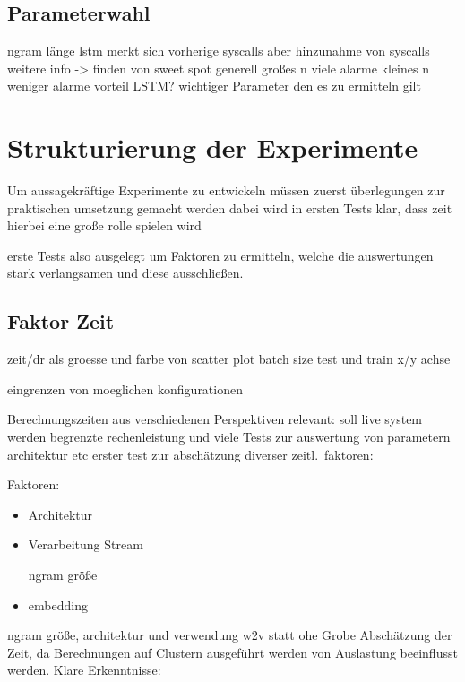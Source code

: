         \subsection{Parameterwahl}
            ngram länge
            lstm merkt sich vorherige syscalls aber hinzunahme von syscalls weitere info
            -> finden von sweet spot
            generell großes n viele alarme
            kleines n weniger alarme  vorteil LSTM\@?
            wichtiger Parameter den es zu ermitteln gilt


    \section{Strukturierung der Experimente}\label{sec:StrukExp}
        Um aussagekräftige Experimente zu entwickeln müssen zuerst 
        überlegungen zur praktischen umsetzung gemacht werden
        dabei wird in ersten Tests klar, dass zeit hierbei eine große rolle spielen wird

        erste Tests also ausgelegt um Faktoren zu ermitteln, welche die auswertungen stark verlangsamen
        und diese ausschließen.

        \subsection{Faktor Zeit}

            zeit/dr als groesse und farbe von scatter plot
            batch size test und train x/y achse

            eingrenzen von moeglichen konfigurationen

            Berechnungszeiten aus verschiedenen Perspektiven relevant:
            soll live system werden
            begrenzte rechenleistung und viele Tests zur auswertung von parametern architektur etc
            erster test zur abschätzung diverser zeitl.\ faktoren:

            Faktoren:
            \begin{itemize}
                \item Architektur
                \item Verarbeitung Stream

                     ngram größe
                \item embedding
            \end{itemize}
        ngram größe, architektur und verwendung w2v statt ohe
        Grobe Abschätzung der Zeit, da Berechnungen auf Clustern ausgeführt werden von Auslastung beeinflusst werden.
        Klare Erkenntnisse:

